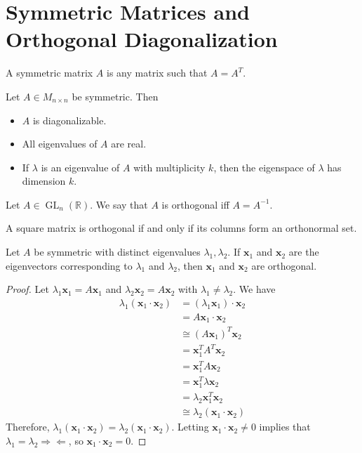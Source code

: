 \section{Symmetric Matrices and Orthogonal Diagonalization}
\begin{definition}
    A symmetric matrix \(A\) is any matrix such that \(A=A^T\).
\end{definition}
\begin{theorem}
    Let \(A\in M_{n\times n}\) be symmetric. Then
    \begin{itemize}
        \item \(A\) is diagonalizable.
        \item All eigenvalues of \(A\) are real.
        \item If \(\lambda \) is an eigenvalue of \(A\) with multiplicity \(k\), then the eigenspace of \(\lambda \) has dimension \(k\).
    \end{itemize}
\end{theorem}
\begin{definition}
    Let \(A\in \operatorname{GL}_n(\mathbb{R} ) \). We say that \(A\) is orthogonal iff \(A=A^{-1} \).
\end{definition}
\begin{theorem}
    A square matrix is orthogonal if and only if its columns form an orthonormal set.
\end{theorem}
\begin{theorem}
    Let \(A\) be symmetric with distinct eigenvalues \(\lambda _1,\lambda _2\). If \(\mathbf{x} _1\) and \(\mathbf{x} _2\) are the eigenvectors corresponding to \(\lambda _1\) and \(\lambda _2\), then \(\mathbf{x} _1\) and \(\mathbf{x} _2\) are orthogonal.
\end{theorem}
\begin{proof}
    Let \(\lambda _1 \mathbf{x} _1 = A \mathbf{x} _1\) and \(\lambda _2 \mathbf{x} _2 = A \mathbf{x} _2\) with \(\lambda _1 \neq \lambda _2\). We have
    \begin{align*}
        \lambda_1 (\mathbf{x} _1 \cdot \mathbf{x} _2)&= (\lambda _1 \mathbf{x} _1)\cdot \mathbf{x} _2\\
        &=A \mathbf{x} _1 \cdot \mathbf{x} _2\\
        &\cong (A \mathbf{x} _1)^T \mathbf{x} _2\\
        &= \mathbf{x} _1^T A^T \mathbf{x} _2\\
        &=\mathbf{x} _1^T A \mathbf{x} _2\\
        &=\mathbf{x} _1^T \lambda \mathbf{x} _2\\
        &=\lambda _2 \mathbf{x} _1^T \mathbf{x} _2\\
        &\cong \lambda _2(\mathbf{x} _1 \cdot \mathbf{x} _2)
    \end{align*}
    Therefore, \(\lambda_1 (\mathbf{x} _1\cdot \mathbf{x} _2)=\lambda _2 (\mathbf{x} _1\cdot \mathbf{x} _2)\). Letting \(\mathbf{x} _1\cdot \mathbf{x}_2 \neq 0\) implies that \(\lambda _1 =\lambda _2 \Longrightarrow \Longleftarrow\), so \(\mathbf{x} _1 \cdot \mathbf{x} _2 = 0\).
\end{proof}
